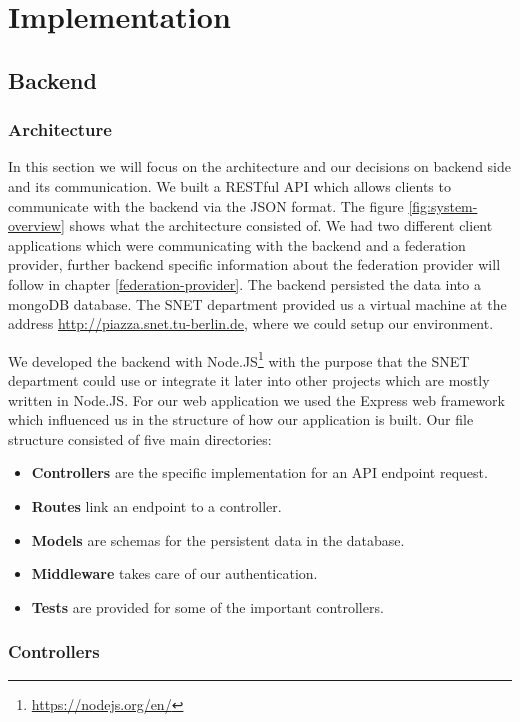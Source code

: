 \chapter{Implementation}
\label{cha:implementation}


\section{Backend}

\subsection{Architecture}

In this section we will focus on the architecture and our decisions on backend side and its communication. We built a RESTful API which allows clients to communicate with the backend via the JSON format. The figure \ref{fig:system-overview} shows what the architecture consisted of. We had two different client applications which were communicating with the backend and a federation provider, further backend specific information about the federation provider will follow in chapter \ref{federation-provider}. The backend persisted the data into a mongoDB database. The SNET department provided us a virtual machine at the address \url{http://piazza.snet.tu-berlin.de}, where we could setup our environment.

We developed the backend with Node.JS\footnote{\url{https://nodejs.org/en/}} with the purpose that the SNET department could use or integrate it later into other projects which are mostly written in Node.JS. For our web application we used the Express web framework which influenced us in the structure of how our application is built. Our file structure consisted of five main directories:
\begin{itemize}
  \item \textbf{Controllers} are the specific implementation for an API endpoint request.
  \item \textbf{Routes} link an endpoint to a controller.
  \item \textbf{Models} are schemas for the persistent data in the database.
  \item \textbf{Middleware} takes care of our authentication.
  \item \textbf{Tests} are provided for some of the important controllers.
\end{itemize}

\subsection{Controllers}

